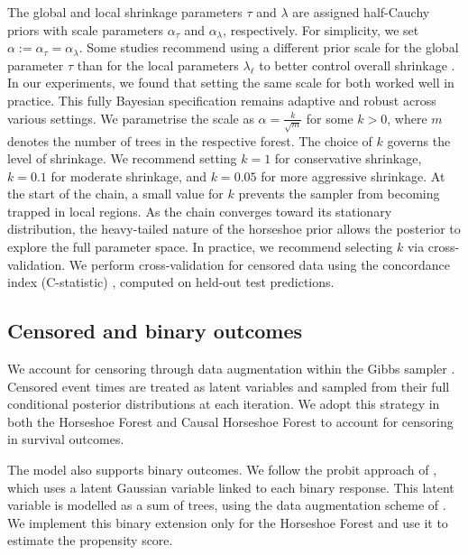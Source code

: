 The global and local shrinkage parameters $\tau$ and $\lambda$ are assigned half-Cauchy priors with scale parameters $\alpha_\tau$ and $\alpha_\lambda$, respectively. 
For simplicity, we set $\alpha := \alpha_\tau = \alpha_\lambda$. 
Some studies recommend using a different prior scale for the global parameter $\tau$ than for the local parameters $\lambda_\ell$ to better control overall shrinkage \citep{Piironen2017Hyperprior}. 
In our experiments, we found that setting the same scale for both worked well in practice.
This fully Bayesian specification remains adaptive and robust across various settings.
We parametrise the scale as $\alpha = \frac{k}{\sqrt{m}}$ for some $k > 0$, where $m$ denotes the number of trees in the respective forest. 
The choice of $k$ governs the level of shrinkage.
We recommend setting $k = 1$ for conservative shrinkage, $k = 0.1$ for moderate shrinkage, and $k = 0.05$ for more aggressive shrinkage. 
At the start of the chain, a small value for $k$ prevents the sampler from becoming trapped in local regions. 
As the chain converges toward its stationary distribution, the heavy-tailed nature of the horseshoe prior allows the posterior to explore the full parameter space. 
In practice, we recommend selecting $k$ via cross-validation.
We perform cross-validation for censored data using the concordance index (C-statistic) \citep{harrell1982evaluating}, computed on held-out test predictions.


\subsection{Censored and binary outcomes}\label{cens_bin}

We account for censoring through data augmentation within the Gibbs sampler \citep{TannerWong1987}. 
Censored event times are treated as latent variables and sampled from their full conditional posterior distributions at each iteration. 
We adopt this strategy in both the Horseshoe Forest and Causal Horseshoe Forest to account for censoring in survival outcomes.

The model also supports binary outcomes.
We follow the probit approach of \citet{BARToriginal}, which uses a latent Gaussian variable linked to each binary response.
This latent variable is modelled as a sum of trees, using the data augmentation scheme of \citet{AlbertChib1993}.
We implement this binary extension only for the Horseshoe Forest and use it to estimate the propensity score.